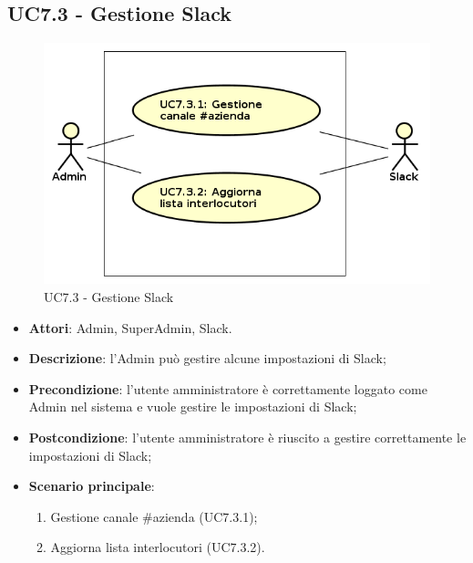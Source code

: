 \documentclass[../AnalisiDeiRequisiti_v3.0.0.tex]{subfiles}
\begin{document}
\subsection{UC7.3 - Gestione Slack} 
\label{sssec:UC7.3} 
\begin{figure}[!h]
	\centering
	\includegraphics[width=\textwidth]{UseCases/UC7_GestionePannelloAdmin/UC7_3_GestioneSlack/UC7_3_GestioneSlack.png}
	\caption{UC7.3 - Gestione Slack}
\end{figure}
\begin{itemize} 
\item \textbf{Attori}: Admin, SuperAdmin, Slack.
\item \textbf{Descrizione}: l'Admin può gestire alcune impostazioni di Slack;
\item \textbf{Precondizione}: l'utente amministratore è correttamente loggato come Admin nel sistema e vuole gestire le impostazioni di Slack;
\item \textbf{Postcondizione}: l'utente amministratore è riuscito a gestire correttamente le impostazioni di Slack;
\item \textbf{Scenario principale}: \begin{enumerate}\item Gestione canale \#azienda (UC7.3.1);\item Aggiorna lista interlocutori (UC7.3.2). 
\end{enumerate}
\end{itemize} 
\end{document}
